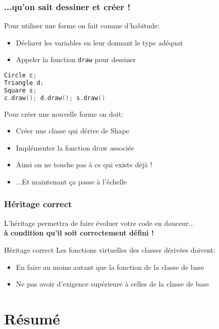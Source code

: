 \documentclass{beamer}
\begin{document}
  \begin{frame}[fragile=singleslide,shrink=20]
  \frametitle{...qu'on sait dessiner et créer !}
\begin{block}{Pour utiliser une forme on fait comme d'habitude:}
\begin{itemize}
\item{Déclarer les variables en leur donnant le type adéquat}
\item{Appeler la fonction \texttt{draw} pour dessiner}
\end{itemize}
\begin{lstlisting}[language=c++]
Circle c;
Triangle d;
Square s;
c.draw(); d.draw(); s.draw()
\end{lstlisting}
\end{block}

\begin{block}{Pour créer une nouvelle forme on doit:}
\begin{itemize}
\item{Créer une classe qui dérive de Shape}
\item{Implémenter la fonction draw associée}
\item{Ainsi on ne touche pas à ce qui existe déjà !}
\item{...Et maintenant ça passe à l'échelle}
\end{itemize}
\end{block}
\end{frame}
  
\begin{frame}
\frametitle{Héritage correct}
L'héritage permettra de faire évoluer votre code en douceur... \\ 
\textbf{à condition qu'il soit correctement défini !}
  
\begin{block}{Héritage correct}
Les fonctions virtuelles des classes dérivées doivent:
\begin{itemize}
\item{En faire au moins autant que la fonction de la classe de base}
\item{Ne pas avoir d'exigence supérieure à celles de la classe de base}
\end{itemize}
\end{block}
\end{frame}

\section{Résumé}
\end{document}
